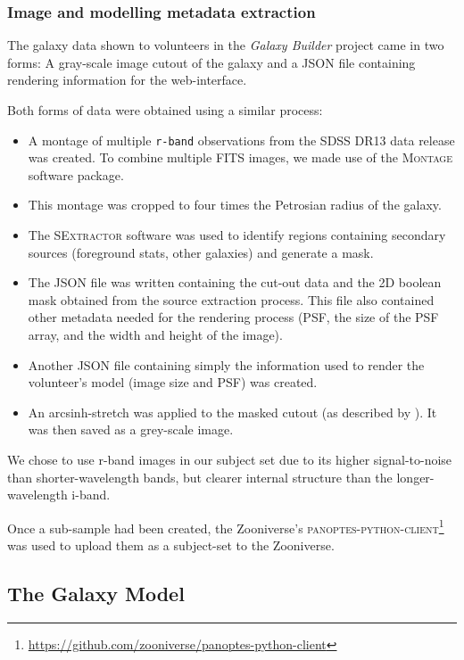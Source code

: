 \documentclass[../main.tex]{subfiles}
\begin{document}
\subsubsection{Image and modelling metadata extraction}

The galaxy data shown to volunteers in the \textit{Galaxy Builder} project came in two forms: A gray-scale image cutout of the galaxy and a JSON file containing rendering information for the web-interface.

Both forms of data were obtained using a similar process:

\begin{itemize}
\item A montage of multiple \texttt{r-band} observations from the SDSS DR13 \citep{2017ApJS..233...25A} data release was created. To combine multiple FITS images, we made use of the \textsc{Montage} \citep{2010arXiv1005.4454J} software package.
\item This montage was cropped to four times the Petrosian radius of the galaxy.
\item The \textsc{SExtractor} software \citep{source-extractor} was used to identify regions containing secondary sources (foreground stats, other galaxies) and generate a mask.
\item The JSON file was written containing the cut-out data and the 2D boolean mask obtained from the source extraction process. This file also contained other metadata needed for the rendering process (PSF, the size of the PSF array, and the width and height of the image).
\item Another JSON file containing simply the information used to render the volunteer's model (image size and PSF) was created.
\item An arcsinh-stretch was applied to the masked cutout (as described by \citealt{Lupton2003:astro-ph/0312483v1}). It was then saved as a grey-scale image.
\end{itemize}

We chose to use r-band images in our subject set due to its higher signal-to-noise than shorter-wavelength bands, but clearer internal structure than the longer-wavelength i-band.

Once a sub-sample had been created, the Zooniverse's \textsc{panoptes-python-client}\footnote{\url{https://github.com/zooniverse/panoptes-python-client}} was used to upload them as a subject-set to the Zooniverse.


\subsection{The Galaxy Model}
\label{section:galaxy-model}
\end{document}
